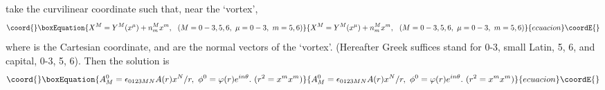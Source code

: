 \documentclass[a4paper,12pt]{article}
\begin{document}
take the curvilinear coordinate \coordHE{} such that, near the `vortex',
\begin{equation}\coord{}\boxEquation{
X^M=Y^M(x^\mu)+n_m^M x^m,\ \ (M=0-3,5,6,\ \mu=0-3,\ m=5,6)
  \label{4}  }{
X^M=Y^M(x^\mu)+n_m^M x^m,\ \ (M=0-3,5,6,\ \mu=0-3,\ m=5,6)
  }{ecuacion}\coordE{}\end{equation}
where \coordHE{} is the Cartesian coordinate, and \coordHE{} are the normal vectors of the `vortex'.
(Hereafter Greek suffices stand for 0-3, small Latin, 5, 6, and capital, 0-3, 5, 6).
Then the solution is 
\begin{equation}\coord{}\boxEquation{
A_M^0=\epsilon_{0123MN}A(r)x^N/r,\ \phi^0=\varphi(r)e^{in\theta}.\ (r^2=x^m x^m)
  \label{5}  }{
A_M^0=\epsilon_{0123MN}A(r)x^N/r,\ \phi^0=\varphi(r)e^{in\theta}.\ (r^2=x^m x^m)
  }{ecuacion}\coordE{}\end{equation}
\end{document}
